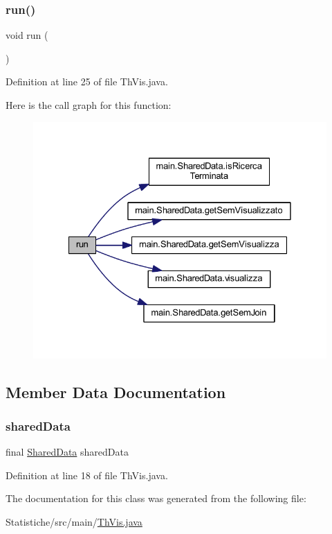 \subsubsection{\texorpdfstring{run()}{run()}}
{\footnotesize\ttfamily void run (\begin{DoxyParamCaption}{ }\end{DoxyParamCaption})}



Definition at line 25 of file Th\+Vis.\+java.

Here is the call graph for this function\+:
\nopagebreak
\begin{figure}[H]
\begin{center}
\leavevmode
\includegraphics[width=328pt]{classmain_1_1_th_vis_a13a43e6d814de94978c515cb084873b1_cgraph}
\end{center}
\end{figure}


\subsection{Member Data Documentation}
\mbox{\label{classmain_1_1_th_vis_ac5f1128ef8d0ba91a8214e03732e2662}} 
\subsubsection{\texorpdfstring{shared\+Data}{sharedData}}
{\footnotesize\ttfamily final \mbox{\hyperlink{classmain_1_1_shared_data}{Shared\+Data}} shared\+Data\hspace{0.3cm}{\ttfamily [private]}}



Definition at line 18 of file Th\+Vis.\+java.



The documentation for this class was generated from the following file\+:\begin{DoxyCompactItemize}
\item 
Statistiche/src/main/\mbox{\hyperlink{_th_vis_8java}{Th\+Vis.\+java}}\end{DoxyCompactItemize}

